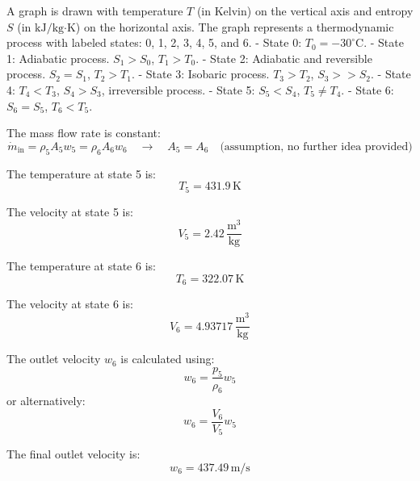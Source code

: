 A graph is drawn with temperature \( T \) (in Kelvin) on the vertical axis and entropy \( S \) (in \( \text{kJ}/\text{kg·K} \)) on the horizontal axis. The graph represents a thermodynamic process with labeled states: 0, 1, 2, 3, 4, 5, and 6.  
- State 0: \( T_0 = -30^\circ\text{C} \).  
- State 1: Adiabatic process. \( S_1 > S_0 \), \( T_1 > T_0 \).  
- State 2: Adiabatic and reversible process. \( S_2 = S_1 \), \( T_2 > T_1 \).  
- State 3: Isobaric process. \( T_3 > T_2 \), \( S_3 >> S_2 \).  
- State 4: \( T_4 < T_3 \), \( S_4 > S_3 \), irreversible process.  
- State 5: \( S_5 < S_4 \), \( T_5 \neq T_4 \).  
- State 6: \( S_6 = S_5 \), \( T_6 < T_5 \).

The mass flow rate is constant:  
\[
\dot{m}_{\text{in}} = \rho_5 A_5 w_5 = \rho_6 A_6 w_6 \quad \rightarrow \quad A_5 = A_6 \quad \text{(assumption, no further idea provided)}
\]  

The temperature at state 5 is:  
\[
T_5 = 431.9 \, \text{K}
\]  

The velocity at state 5 is:  
\[
V_5 = 2.42 \, \frac{\text{m}^3}{\text{kg}}
\]  

The temperature at state 6 is:  
\[
T_6 = 322.07 \, \text{K}
\]  

The velocity at state 6 is:  
\[
V_6 = 4.93717 \, \frac{\text{m}^3}{\text{kg}}
\]  

The outlet velocity \( w_6 \) is calculated using:  
\[
w_6 = \frac{p_5}{\rho_6} w_5
\]  
or alternatively:  
\[
w_6 = \frac{V_6}{V_5} w_5
\]  

The final outlet velocity is:  
\[
w_6 = 437.49 \, \text{m/s}
\]